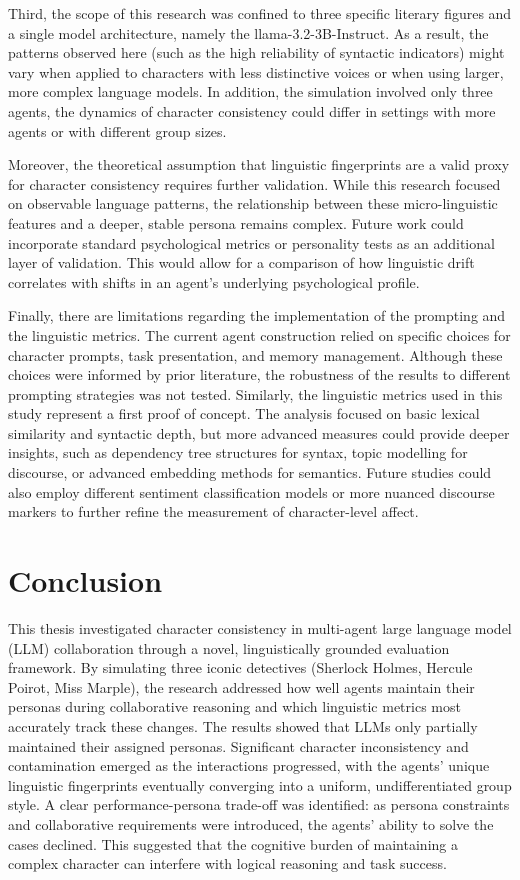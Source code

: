 \documentclass{article}
\begin{document}
Third, the scope of this research was confined to three specific literary figures and a single model architecture, namely the llama-3.2-3B-Instruct. As a result, the patterns observed here (such as the high reliability of syntactic indicators) might vary when applied to characters with less distinctive voices or when using larger, more complex language models. In addition, the simulation involved only three agents, the dynamics of character consistency could differ in settings with more agents or with different group sizes.

Moreover, the theoretical assumption that linguistic fingerprints are a valid proxy for character consistency requires further validation. While this research focused on observable language patterns, the relationship between these micro-linguistic features and a deeper, stable persona remains complex. Future work could incorporate standard psychological metrics or personality tests as an additional layer of validation. This would allow for a comparison of how linguistic drift correlates with shifts in an agent's underlying psychological profile.

Finally, there are limitations regarding the implementation of the prompting and the linguistic metrics. The current agent construction relied on specific choices for character prompts, task presentation, and memory management. Although these choices were informed by prior literature, the robustness of the results to different prompting strategies was not tested. Similarly, the linguistic metrics used in this study represent a first proof of concept. The analysis focused on basic lexical similarity and syntactic depth, but more advanced measures could provide deeper insights, such as dependency tree structures for syntax, topic modelling for discourse, or advanced embedding methods for semantics. Future studies could also employ different sentiment classification models or more nuanced discourse markers to further refine the measurement of character-level affect.


\section{Conclusion} \label{sec:conclusion}

This thesis investigated character consistency in multi-agent large language model (LLM) collaboration through a novel, linguistically grounded evaluation framework. By simulating three iconic detectives (Sherlock Holmes, Hercule Poirot, Miss Marple), the research addressed how well agents maintain their personas during collaborative reasoning and which linguistic metrics most accurately track these changes. The results showed that LLMs only partially maintained their assigned personas. Significant character inconsistency and contamination emerged as the interactions progressed, with the agents' unique linguistic fingerprints eventually converging into a uniform, undifferentiated group style. A clear performance-persona trade-off was identified: as persona constraints and collaborative requirements were introduced, the agents' ability to solve the cases declined. This suggested that the cognitive burden of maintaining a complex character can interfere with logical reasoning and task success.
\end{document}
